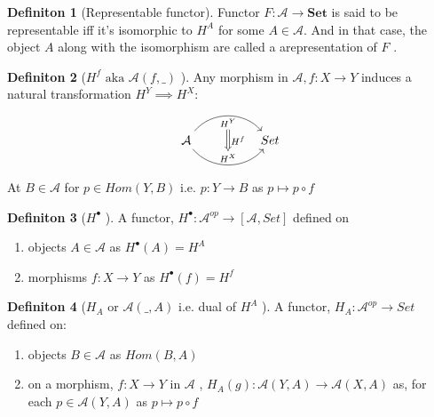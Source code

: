 \documentclass{article}
\theoremstyle{definition}
\theoremstyle{definition}
\newtheorem{definition}{Definiton}[section]
\theoremstyle{definition}
\theoremstyle{definition}
\begin{document}
\begin{definition}[Representable functor] %
	Functor $F:\mathcal{A} \rightarrow \textbf{Set}$ is said to be representable iff it's isomorphic to
	$H^A$ for some $A \in \mathcal{A} $. And in that case, the object $A$ along with the isomorphism
	are called a arepresentation of $F$ .
\end{definition}

\begin{definition}[$H^f \text{ aka } \mathcal{A} (f, \_)$ ] %
	Any morphism in $\mathcal{A}, f:X \rightarrow Y	$ induces a natural transformation $H^Y \implies H^X $:
	\[ 	\begin{tikzcd}[row sep=large, column sep=huge]
	\mathcal{ \mathcal{A} } \arrow[r,bend left=50, "H^Y"{name=U, below}]
	\arrow[r, bend right = 50, "H^X"{name=D, above}]
	& Set \arrow[Rightarrow, from=U , to=D, "H^f"]
		\end{tikzcd} \]
		At $B \in \mathcal{A} $ for $p \in Hom (Y,B) \text{ i.e. } p:Y \rightarrow B $ as
		$p \mapsto p \circ f$
\end{definition}

\begin{definition}[$H^\bullet$ ] %
	A functor, $H^\bullet : \mathcal{A} ^{op} \rightarrow [ \mathcal{A} , Set ] $ defined on
	\begin{enumerate}[label=\roman*]
		\item objects $A \in \mathcal{A} $ as $H^\bullet (A) = H^A$
		\item morphisms $f:X\rightarrow Y$ as $H^\bullet(f)=H^f$
	\end{enumerate}
\end{definition}

\begin{definition}[$H_A$ or $\mathcal{A} (\_,A)$  i.e. dual of $H^A$ ] %
	A functor, $H_A: \mathcal{A} ^{op} \rightarrow Set$ defined on:
	\begin{enumerate}[label=\roman*]
		\item objects $B \in \mathcal{A} $ as $Hom(B,A)$
		\item on a morphism, $f : X \rightarrow Y $ in $\mathcal{A}$ , $H_A(g): \mathcal{A} (Y,A) \rightarrow \mathcal{A}(X,A) $ as, for each $p \in \mathcal{A}(Y,A) $ as $p \mapsto p \circ f$
	\end{enumerate}
\end{definition}
\end{document}
